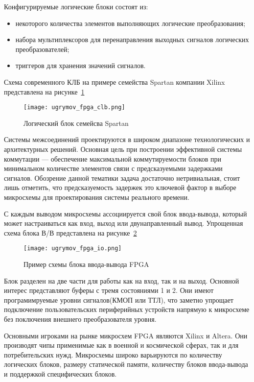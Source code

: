 Конфигурируемые логические блоки состоят из:
\begin{itemize}
  \item некоторого количества элементов выполняющих логические преобразования;
  \item набора мультиплексоров для перенаправления выходных сигналов логических преобразователей;
  \item триггеров для хранения значений сигналов.
\end{itemize}

Схема современного КЛБ на примере семейства Spartan компании Xilinx представлена на рисунке~\ref{fig:domain:fpga:clb}

\begin{figure}[ht]
  \centering
  \texttt{[image: ugrymov\_fpga\_clb.png]}
  \caption{ Логический блок семейсва Spartan }
  \label{fig:domain:fpga:clb}
\end{figure}

Системы межсоединений проектируются в широком диапазоне технологических и архитектурных решений.
Основная цель при построении эффективной системы коммутации --- обеспечение максимальной коммутируемости блоков
при минимальном количестве элементов связи с предсказуемыми задержками сигналов. Обозрение данной тематики задача достаточно нетривиальная,
стоит лишь отметить, что предсказуемость задержек это ключевой фактор в выборе микросхемы для проектирования системы реального времени.

С каждым выводом микросхемы ассоциируется свой блок ввода-вывода, который может настраиваться как вход, выход или двунаправленный вывод.
Упрощенная схема блока В/В представлена на рисунке~\ref{fig:domain:fpga:io}

\begin{figure}[ht]
  \centering
  \texttt{[image: ugrymov\_fpga\_io.png]}
  \caption{ Пример схемы блока ввода-вывода FPGA }
  \label{fig:domain:fpga:io}
\end{figure}

Блок разделен на две части для работы как на вход, так и на выход. Основной интерес представляют буферы с тремя состояниями
1 и 2. Они имеют програмимруемые уровни сигналов(КМОП или ТТЛ), что заметно упрощает подключение пользовательских периферийных устройств
напрямую к микросхеме без поключения внешнего преобразователя уровня.

Основными игроками на рынке микросхем FPGA являются Xilinx и Altera. Они производят чипы применимые как в военной и космической сферах,
так и для потребительских нужд. Микросхемы широко варьируются по количеству логических блоков, размеру
статической памяти, количеству блоков ввода-вывода и поддержкой специфических блоков.

